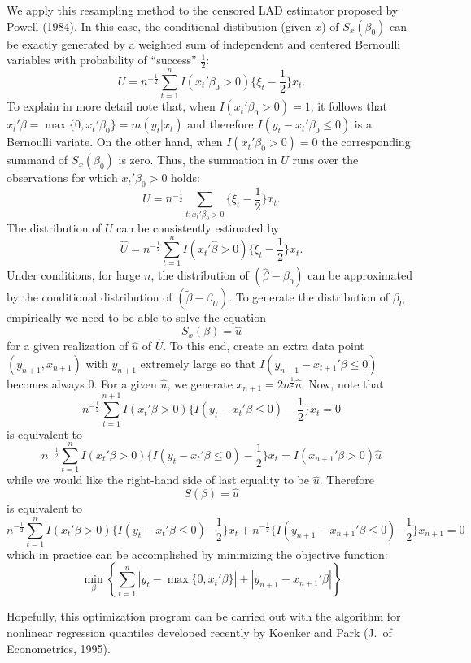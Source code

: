 \documentclass[12pt]{article}
\begin{document}
We apply this resampling method to the censored LAD estimator proposed by
Powell (1984).  In this case, the conditional distibution (given $x$) of
$S_x(\beta_0)$ can be exactly generated by a weighted sum of independent and
centered Bernoulli variables with probability of ``success'' $\frac{1}{2}$:
\[
U = n^{-\frac{1}{2}} \sum _{t=1}^n I(x_t' \beta_0 > 0) \{\xi_t -
\frac{1}{2}\} x_t.
\]
To explain in more detail note that, when $I(x_t'\beta_0 > 0) = 1$, it follows
that $x_t' \beta = \max\{0, x_t'\beta_0\} = m(y_t|x_t)$ and therefore $I(y_t -
x_t'\beta_0 \le 0)$ is a Bernoulli variate.  On the other hand, when $I(x_t'
\beta_0 > 0) = 0$ the corresponding summand of $S_x(\beta_0)$ is zero.  Thus,
the summation in $U$ runs over the observations for which $x_t'\beta_0 > 0$ 
holds:
\[
U = n^{-\frac{1}{2}} \sum_{t:x_t' \beta_0>0} \{\xi_t - \frac {1}{2}\} x_t.
\]
The distribution of $U$ can be consistently estimated by
\[
{\hat U} = n^{-\frac{1}{2}} \sum_{t=1}^n I(x_t'{\hat \beta} > 0) \{\xi_t -
\frac {1}{2} \} x_t.
\]
Under conditions, for large $n$, the distribution of $(\hat \beta - \beta_0)$
can be approximated by the conditional distribution of $({\tilde \beta} -
\beta_U )$.  To generate the distribution of $\beta_U$ empirically we need to
be able to solve the equation
\[
S_x(\beta) = {\hat u}
\]
for a given realization of ${\hat u}$ of ${\hat U}$.  To this end, create an
extra data point $(y_{n+1}, x_{n+1})$ with $y_{n+1}$ extremely large so that
$I(y_{n+1} - x_{t+1}' \beta \le 0)$ becomes always 0.  For a given ${\hat
u}$, we generate $x_{n+1} = 2n^{\frac {1}{2}} {\hat u}$.  Now, note that 
\[
n^{-\frac {1}{2}} \sum_{t=1}^{n+1} I(x_t' \beta > 0) \{ I(y_t - x_t'
\beta \le 0 )  -\frac{1}{2} \} x_t = 0
\] 
is equivalent to
\[
n^{-\frac {1}{2}} \sum_{t=1}^n I(x_t' \beta > 0 ) \{ I(y_t - x_t' \beta
\le 0 )  -\frac {1}{2} \} x_t 
= I(x_{n+1}' \beta > 0 ) {\hat u}
\]
while we would like the right-hand side of last equality to be ${\hat u}$. 
Therefore
\[
S(\beta) = {\hat u} 
\]
is equivalent to 
\[
n^{-\frac {1}{2}} \sum_{t=1}^n I(x_t' \beta > 0) 
\{ I( y_t - x_t' \beta \le 0) {-\frac {1}{2}} \} x_t
+  n^{-\frac {1}{2}} \{I( y_{n+1} - x_{n+1}' \beta \le 0) {-\frac {1}{2}}
\} x_{n+1} = 0
\]
which in practice can be accomplished by minimizing the objective function:
\[
\min_\beta \left\{ \sum_{t=1}^n | y_t - \max \{0, x_t' \beta \} | + 
| y_{n+1} - x_{n+1} ' \beta | \right\}
\]

\bigskip

Hopefully, this optimization program can be carried out with the algorithm for
nonlinear regression quantiles developed recently by Koenker and Park 
(J.\ of Econometrics, 1995).
\end{document}
